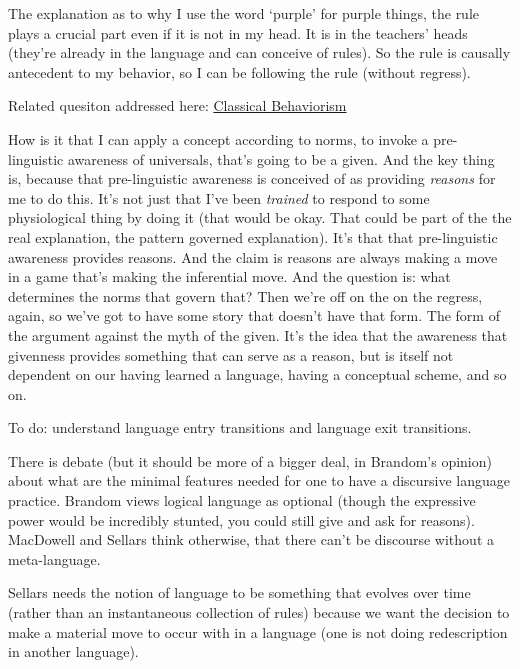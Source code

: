 The explanation as to why I use the word `purple' for purple things, the rule plays a crucial part even if it is not in my head. It is in the teachers' heads (they're already in the language and can conceive of rules). So the rule is causally antecedent to my behavior, so I can be following the rule (without regress).

Related quesiton addressed here: \href{doc/2 phil/Phil Situations/Classical Behaviorism}{Classical Behaviorism}

How is it that I can apply a concept according to norms, to invoke a pre-linguistic awareness of universals, that's going to be a given. And the key thing is, because that pre-linguistic awareness is conceived of as providing \emph{reasons} for me to do this. It's not just that I've been \emph{trained} to respond to some physiological thing by doing it (that would be okay. That could be part of the the real explanation, the pattern governed explanation). It's that that pre-linguistic awareness provides reasons. And the claim is reasons are always making a move in a game that's making the inferential move. And the question is: what determines the norms that govern that? Then we're off on the on the regress, again, so we've got to have some story that doesn't have that form. The form of the argument against the myth of the given. It's the idea that the awareness that givenness provides something that can serve as a reason, but is itself not dependent on our having learned a language, having a conceptual scheme, and so on.

To do: understand language entry transitions and language exit transitions.

There is debate (but it should be more of a bigger deal, in Brandom's opinion) about what are the minimal features needed for one to have a discursive language practice. Brandom views logical language as optional (though the expressive power would be incredibly stunted, you could still give and ask for reasons). MacDowell and Sellars think otherwise, that there can't be discourse without a meta-language.

Sellars needs the notion of language to be something that evolves over time (rather than an instantaneous collection of rules) because we want the decision to make a material move to occur with in a language (one is not doing redescription in another language).